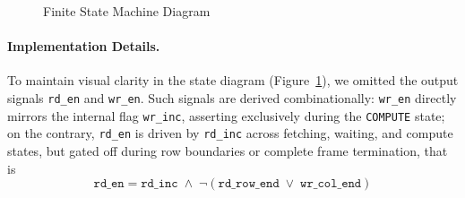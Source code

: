 \begin{figure}[H]
\caption{Finite State Machine Diagram}
\label{fig:fsm}
\end{figure}

\paragraph{Implementation Details.}

To maintain visual clarity in the state diagram (Figure~\ref{fig:fsm}), we omitted the output signals \texttt{rd\_en} and \texttt{wr\_en}. Such signals are derived combinationally: \texttt{wr\_en} directly mirrors the internal flag \texttt{wr\_inc}, asserting exclusively during the \texttt{COMPUTE} state; on the contrary, \texttt{rd\_en} is driven by \texttt{rd\_inc} across fetching, waiting, and compute states, but gated off during row boundaries or complete frame termination, that is
$$\texttt{rd\_en} = \texttt{rd\_inc} \;\wedge\; \neg(\texttt{rd\_row\_end} \;\vee\; \texttt{wr\_col\_end})$$

